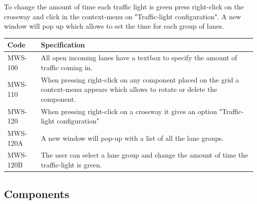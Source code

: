 To change the amount of time each traffic light is green press right-click on the crossway and click in the context-menu on "Traffic-light configuration". A new window will pop up which allows to set the time for each group of lanes.

\begin{tabularx}{\textwidth}{|p{2cm}X|}\hline
	Code & Specification \\\hline
	MWS-100 & All open incoming lanes have a textbox to specify the amount of traffic coming in.\\\hline
	MWS-110 & When pressing right-click on any component placed on the grid a context-menu appears which allows to rotate or delete the component.\\\hline
	MWS-120 & When pressing right-click on a crossway it gives an option "Traffic-light configuration"\\\hline
	MWS-120A & A new window will pop-up with a list of all the lane groups.\\\hline
	MWS-120B & The user can select a lane group and change the amount of time the traffic-light is green.\\\hline
\end{tabularx}

\subsection{Components}
\label{sec:components}